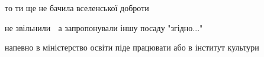 \begin{itemize}
\begin{itemize}
то ти ще не бачила вселенської доброти
\end{itemize}

 
не звільнили 🙁 а запропонували іншу посаду "згідно..."

 
напевно в міністерство освіти піде працювати або в інститут культури

\end{itemize}

